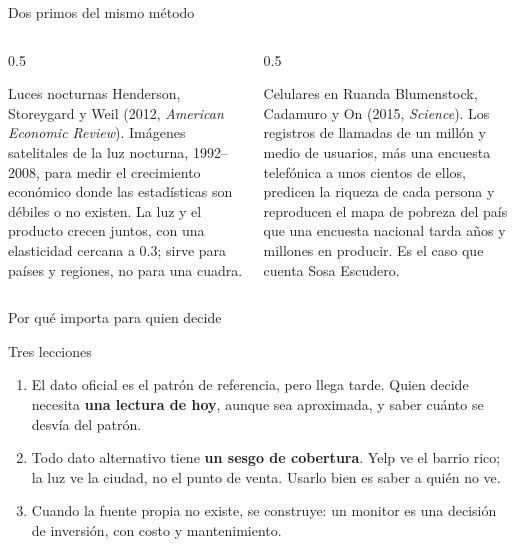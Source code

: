 \documentclass{beamer}
\begin{document}
\begin{frame}{Dos primos del mismo método}
\begin{columns}[T]
\begin{column}{0.5\textwidth}
\begin{block}{Luces nocturnas}
Henderson, Storeygard y Weil (2012, \emph{American Economic Review}). Imágenes satelitales de la luz nocturna, 1992--2008, para medir el crecimiento económico donde las estadísticas son débiles o no existen. La luz y el producto crecen juntos, con una elasticidad cercana a 0.3; sirve para países y regiones, no para una cuadra.
\end{block}
\end{column}
\begin{column}{0.5\textwidth}
\begin{block}{Celulares en Ruanda}
Blumenstock, Cadamuro y On (2015, \emph{Science}). Los registros de llamadas de un millón y medio de usuarios, más una encuesta telefónica a unos cientos de ellos, predicen la riqueza de cada persona y reproducen el mapa de pobreza del país que una encuesta nacional tarda años y millones en producir. Es el caso que cuenta Sosa Escudero.
\end{block}
\end{column}
\end{columns}
\end{frame}

\begin{frame}{Por qué importa para quien decide}
\begin{block}{Tres lecciones}
\begin{enumerate}\itemsep4pt
  \item El dato oficial es el patrón de referencia, pero llega tarde. Quien decide necesita \textbf{una lectura de hoy}, aunque sea aproximada, y saber cuánto se desvía del patrón.
  \item Todo dato alternativo tiene \textbf{un sesgo de cobertura}. Yelp ve el barrio rico; la luz ve la ciudad, no el punto de venta. Usarlo bien es saber a quién no ve.
  \item Cuando la fuente propia no existe, se construye: un monitor es una decisión de inversión, con costo y mantenimiento.
\end{enumerate}
\end{block}
\end{frame}
\end{document}

